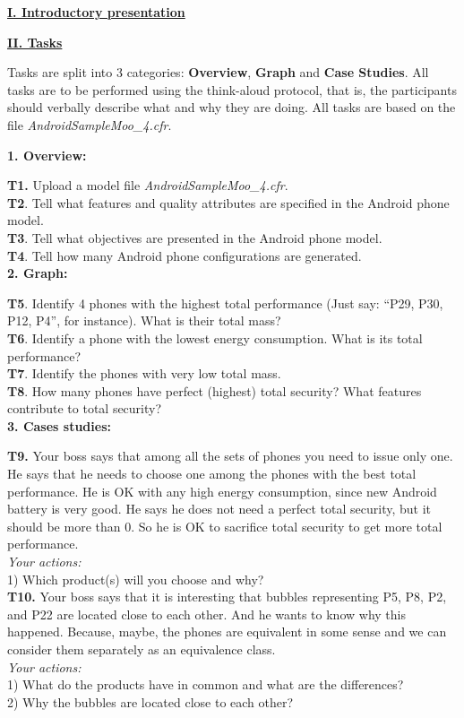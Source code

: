 \documentclass{acm_proc_article-sp}
\begin{document}
\underline{ \textbf{I. Introductory presentation}}

\underline{ \textbf{II. Tasks}}

Tasks are split into 3 categories: \textbf{Overview}, \textbf{Graph} and \textbf{Case Studies}. All tasks are to be performed using the think-aloud protocol, that is, the participants should verbally describe what and why they are doing. All tasks are based on the file \textit{AndroidSampleMoo\_4.cfr}.

\textbf{1. Overview:}

\textbf{T1.} Upload a model file \textit{AndroidSampleMoo\_4.cfr}.\\
\textbf{T2}. Tell what features and quality attributes are specified in the Android phone model.\\
\textbf{T3}. Tell what objectives are presented in the Android phone model.\\
\textbf{T4}. Tell how many Android phone configurations are generated.\\

\textbf{2. Graph:}

\textbf{T5}. Identify 4 phones with the highest total performance (Just say: “P29, P30, P12, P4”, for instance). What is their total mass?\\
\textbf{T6}. Identify a phone with the lowest energy consumption. What is its total performance?\\
\textbf{T7}. Identify the phones with very low total mass.\\
\textbf{T8}. How many phones have perfect (highest) total security? What features contribute to total security?\\

\textbf{3. Cases studies:}

\textbf{T9.} Your boss says that among all the sets of phones you need to issue only one. He says that he needs to choose one among the phones with the best total performance. He is OK with any high energy consumption, since new Android battery is very good. He says he does not need a perfect total security, but it should be more than 0. So he is OK to sacrifice total security to get more total performance.\\
\textit{Your actions:}\\
1) Which product(s) will you choose and why?\\

\textbf{T10.} Your boss says that it is interesting that bubbles representing P5, P8, P2, and P22 are located close to each other. And he wants to know why this happened. Because, maybe, the phones are equivalent in some sense and we can consider them separately as an equivalence class.\\
\textit{Your actions:}\\
1) What do the products have in common and what are the differences?\\
2) Why the bubbles are located close to each other?\\
\end{document}
